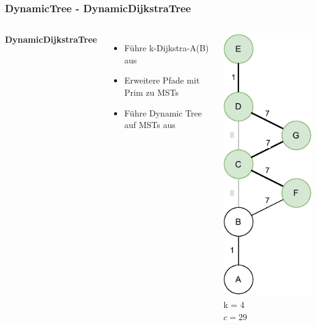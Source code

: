\documentclass[aspectratio=169]{beamer}
\begin{document}
\begin{frame}
	\frametitle{DynamicTree - DynamicDijkstraTree}
	\begin{columns}[c] %
		
		\textbf{DynamicDijkstraTree}
		\begin{itemize}
			\item Führe k-Dijkstra-A(B) aus
			\item Erweitere Pfade mit Prim zu MSTs
			\item Führe Dynamic Tree auf MSTs aus
		\end{itemize}
		\includegraphics[scale=.6]{dynamic_prim.pdf}
		k = 4\\
		$c = 29$
		
		
	\end{columns}
	\end{frame}
	
\end{document}
